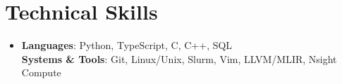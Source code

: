 \documentclass[letterpaper,11pt]{article}
\begin{document}
\section{Technical Skills}
 \begin{itemize}[leftmargin=0in, label={}]
    \item
        \textbf{Languages}: Python, TypeScript, C, C++, SQL \\
        \textbf{Systems \& Tools}: Git, Linux/Unix, Slurm, Vim, LLVM/MLIR, Nsight Compute \\
 \end{itemize}
 
\end{document}
